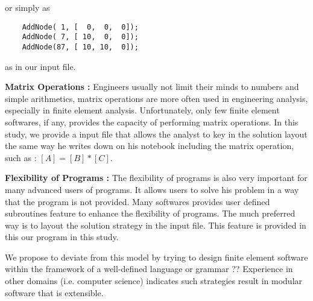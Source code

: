 \noindent or simply as  
\begin{footnotesize} 
\begin{verbatim}
    AddNode( 1, [  0,  0,  0]);
    AddNode( 7, [ 10,  0,  0]);
    AddNode(87, [ 10, 10,  0]);
\end{verbatim}
\end{footnotesize} 
\noindent
as in our input file.
\vspace{0.25 in}

\noindent
{\bf Matrix Operations :}
Engineers usually not limit their minds to numbers and simple arithmetics, matrix
operations are more often used in engineering analysis, especially in finite element analysis.
Unfortunately, only few finite element softwares, if any, provides the capacity 
of performing matrix operations. In this study, we provide a 
input file that allows the analyst to key in the solution layout the same
way he writes down on his notebook including the matrix operation, such as : $[A] = [B]*[C] $. 
\vspace{0.15 in}

\noindent
{\bf Flexibility of Programs : }
The flexibility of programs is also very important for many advanced users of programs.
It allows users to solve his problem in a way that the program is not provided. Many softwares
provides user defined subroutines feature to enhance the flexibility of programs. The much
preferred way is to layout the solution strategy in the input file. This feature is provided
in this our program in this study.
\vspace{0.15 in}

\noindent\hspace{0.5 in}
We propose to deviate from this model by trying to design finite element
software within the framework of a well-defined language or grammar ??
Experience in other domains (i.e. computer science) indicates such
strategies result in modular software that is extensible. 
\vspace{0.15 in}

